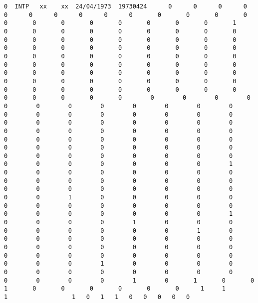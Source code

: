 \documentclass[12pt,fleqn]{article}\usepackage{../common}
\begin{document}
\begin{verbatim}
0  INTP   xx    xx  24/04/1973  19730424      0      0      0      0      0      0      0      0      0      0       0       0       0       0       0       0       0       0       0       0       0       0       1       0       0       0       0       0       0       0       0       0       0       0       0       0       0       0       0       0       0       0       0       0       0       0       0       0       0       0       0       0       0       0       0       0       0       0       0       0       0       0       0       0       0       0       0       0       0       0       0       0       0       0       0       0       0       0       0       0       0       0       0       0       0       0       0       0       0       0       0       0       0       0       0       0       0       0       0       0        0        0        0        0        0        0        0        0        0        0        0        0        0        0        0        0        0        0        0        0        0        0        0        0        0        0        0        0        0        0        0        0        0        0        0        0        0        0        0        0        0        0        0        0        0        0        0        0        0        0        0        0        0        0        0        0        0        0        0        0        0        0        0        0        0        0        0        1        0        0        0        0        0        0        0        0        0        0        0        0        0        0        0        0        0        0        0        0        0        0        0        0        0        0        1        0        0        0        0        0        0        0        0        0        0        0        0        0        0        0        0        0        0        0        0        1        0        0        0        0        1        0        0        0        0        0        0        0        0        0        1        0        0        0        0        0        0        0        0        0        0        0        0        0        0        0        0        0        0        0        0        0        0        0        0        0        0        0        0        1        0        0        0        0        0        0        0        0        0        0        0        0        0        0        0        0        1        0       1       0       0       1       0       0       0       0       0       0      1     1           1                  1   0   1   1   0   0   0   0   0
\end{verbatim}
\end{document}
